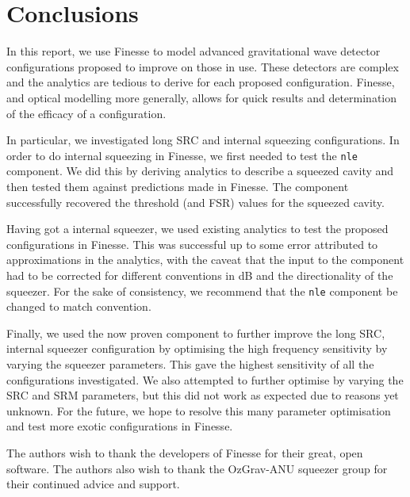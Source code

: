 \documentclass[aps,pra,superscriptaddress,reprint,nofootinbib]{revtex4-1}
\newcommand{\code}[1]{\texttt{#1}}
\begin{document}


\section{Conclusions}
\label{sec:conclusions}

In this report, we use Finesse to model advanced gravitational wave detector configurations proposed to improve on those in use. These detectors are complex and the analytics are tedious to derive for each proposed configuration. Finesse, and optical modelling more generally, allows for quick results and determination of the efficacy of a configuration.


In particular, we investigated long SRC and internal squeezing configurations. In order to do internal squeezing in Finesse, we first needed to test the \code{nle} component. We did this by deriving analytics to describe a squeezed cavity and then tested them against predictions made in Finesse. The component successfully recovered the threshold (and FSR) values for the squeezed cavity.


Having got a internal squeezer, we used existing analytics to test the proposed configurations in Finesse. This was successful up to some error attributed to approximations in the analytics, with the caveat that the input to the component had to be corrected for different conventions in dB and the directionality of the squeezer. For the sake of consistency, we recommend that the \code{nle} component be changed to match convention.


Finally, we used the now proven component to further improve the long SRC, internal squeezer configuration by optimising the high frequency sensitivity by varying the squeezer parameters. This gave the highest sensitivity of all the configurations investigated. We also attempted to further optimise by varying the SRC and SRM parameters, but this did not work as expected due to reasons yet unknown. For the future, we hope to resolve this many parameter optimisation and test more exotic configurations in Finesse.


\begin{acknowledgments}
The authors wish to thank the developers of Finesse for their great, open software.
The authors also wish to thank the OzGrav-ANU squeezer group for their continued advice and support.

\end{acknowledgments}
\end{document}
